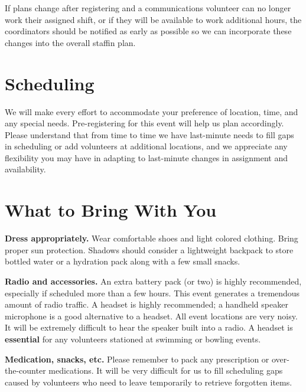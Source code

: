 \documentclass[pdflatex,letterpaper,twoside,12pt]{book}
\begin{document}
If plans change after registering and a communications volunteer can no longer work their assigned shift, or if they will be available to work additional hours, the coordinators should be notified as early as possible so we can incorporate these changes into the overall staffin plan.


\section{Scheduling}

We will make every effort to accommodate your preference of location, time, and any special needs.  Pre-registering for this event will help us plan accordingly.  Please understand that from time to time we have last-minute needs to fill gaps in scheduling or add volunteers at additional locations, and we appreciate any flexibility you may have in adapting to last-minute changes in assignment and availability.


\section{What to Bring With You}

\textbf{Dress appropriately.}  Wear comfortable shoes and light colored clothing.  Bring proper sun protection.  Shadows should consider a lightweight backpack to store bottled water or a hydration pack along with a few small snacks.

\textbf{Radio and accessories.}  An extra battery pack (or two) is highly recommended, especially if scheduled more than a few hours.  This event generates a tremendous amount of radio traffic.  A headset is highly recommended;  a handheld speaker microphone is a good alternative to a headset.  All event locations are very noisy.  It will be extremely difficult to hear the speaker built into a radio.  A headset is \textbf{essential} for any volunteers stationed at swimming or bowling events.

\textbf{Medication, snacks, etc.}  Please remember to pack any prescription or over-the-counter medications.  It will be very difficult for us to fill scheduling gaps caused by volunteers who need to leave temporarily to retrieve forgotten items.
\end{document}
